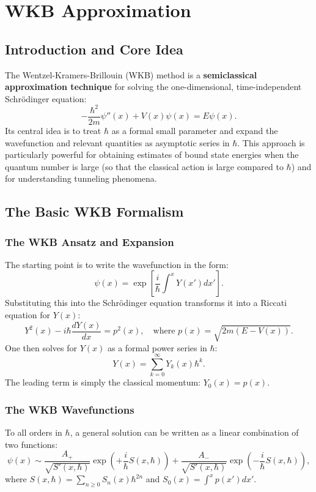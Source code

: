 \section{WKB Approximation}
\subsection{Introduction and Core Idea}
The Wentzel-Kramers-Brillouin (WKB) method is a \textbf{semiclassical approximation technique} for solving the one-dimensional, time-independent Schr\"odinger equation:
\[
-\frac{\hbar^2}{2m} \psi''(x) + V(x)\psi(x) = E\psi(x).
\]
Its central idea is to treat $\hbar$ as a formal small parameter and expand the wavefunction and relevant quantities as asymptotic series in $\hbar$. This approach is particularly powerful for obtaining estimates of bound state energies when the quantum number is large (so that the classical action is large compared to $\hbar$) and for understanding tunneling phenomena.

\subsection{The Basic WKB Formalism}
\subsubsection{The WKB Ansatz and Expansion}
The starting point is to write the wavefunction in the form:
\[
\psi(x) = \exp\left[\frac{i}{\hbar} \int^x Y(x') dx'\right].
\]
Substituting this into the Schr\"odinger equation transforms it into a Riccati equation for $Y(x)$:
\[
Y^2(x) - i\hbar \frac{dY(x)}{dx} = p^2(x), \quad \text{where } p(x) = \sqrt{2m(E - V(x))}.
\]
One then solves for $Y(x)$ as a formal power series in $\hbar$:
\[
Y(x) = \sum_{k=0}^{\infty} Y_k(x) \hbar^k.
\]
The leading term is simply the classical momentum: $Y_0(x) = p(x)$.

\subsubsection{The WKB Wavefunctions}
To all orders in $\hbar$, a general solution can be written as a linear combination of two functions:
\[
\psi(x) \sim \frac{A_+}{\sqrt{S'(x, \hbar)}} \exp\left(+\frac{i}{\hbar} S(x, \hbar)\right) + \frac{A_-}{\sqrt{S'(x, \hbar)}} \exp\left(-\frac{i}{\hbar} S(x, \hbar)\right),
\]
where $S(x, \hbar) = \sum_{n\ge 0} S_n(x) \hbar^{2n}$ and $S_0(x) = \int^x p(x') dx'$.

